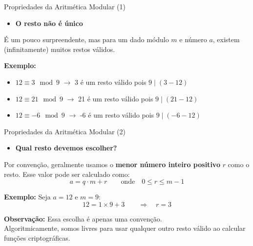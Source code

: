 \documentclass{beamer}
\begin{document}
\begin{frame}{Propriedades da Aritmética Modular (1)}
\begin{itemize}
    \item \textbf{O resto não é único}
\end{itemize}

É um pouco surpreendente, mas para um dado módulo $m$ e número $a$, existem (infinitamente) muitos restos válidos.

\vspace{0.5em}
\textbf{Exemplo:}
\begin{itemize}
    \item $12 \equiv 3 \mod 9$ $\rightarrow$ 3 é um resto válido pois $9 \mid (3 - 12)$

    \item $12 \equiv 21 \mod 9$ $\rightarrow$ 21 é um resto válido pois $9 \mid (21 - 12)$

    \item $12 \equiv -6 \mod 9$  $\rightarrow$ -6 é um resto válido pois $9 \mid (-6 - 12)$
\end{itemize}
\end{frame}



\begin{frame}{Propriedades da Aritmética Modular (2)}
\begin{itemize}
    \item \textbf{Qual resto devemos escolher?}
\end{itemize}

Por convenção, geralmente usamos o \textbf{menor número inteiro positivo} $r$ como o resto. Esse valor pode ser calculado como:
\[
a = q \cdot m + r \qquad \text{onde} \quad 0 \leq r \leq m - 1
\]

\textbf{Exemplo:} Seja $a = 12$ e $m = 9$:
\[
12 = 1 \times 9 + 3 \qquad \Rightarrow \quad r = 3
\]

\vspace{1em}
\textbf{Observação:} Essa escolha é apenas uma convenção. \\
Algoritmicamente, somos livres para usar qualquer outro resto válido ao calcular funções criptográficas.
\end{frame}
\end{document}
